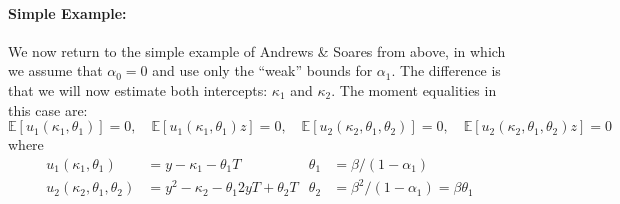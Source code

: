 \documentclass[12pt]{article}
\begin{document}
\paragraph{Simple Example:}
We now return to the simple example of Andrews \& Soares from above, in which we assume that $\alpha_0 = 0$ and use only the ``weak'' bounds for $\alpha_1$.
The difference is that we will now estimate both intercepts: $\kappa_1$ and $\kappa_2$.
The moment equalities in this case are:
\[
  \mathbb{E}\left[ u_1(\kappa_1, \theta_1) \right] = 0, \quad
  \mathbb{E}\left[ u_1(\kappa_1, \theta_1) z \right] = 0, \quad
  \mathbb{E}\left[ u_2(\kappa_2, \theta_1, \theta_2) \right] = 0, \quad
  \mathbb{E}\left[ u_2(\kappa_2, \theta_1, \theta_2) z \right] = 0
\]
where
\begin{align*}
u_1(\kappa_1, \theta_1) &= y - \kappa_1 - \theta_1 T & \theta_1 &= \beta/(1 - \alpha_1)\\
  u_2(\kappa_2, \theta_1, \theta_2) &= y^2 - \kappa_2 - \theta_1 2 yT + \theta_2 T & \theta_2 &= \beta^2/(1 - \alpha_1) = \beta \theta_1
\end{align*}
\end{document}
